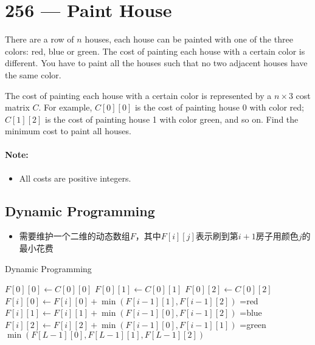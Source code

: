 \section{256 --- Paint House}
There are a row of $n$ houses, each house can be painted with one of the three colors: red, blue or green. The cost of painting each house with a certain color is different. You have to paint all the houses such that no two adjacent houses have the same color.
\par
The cost of painting each house with a certain color is represented by a $n \times 3$ cost matrix $C$. For example, $C[0][0]$ is the cost of painting house 0 with color red; $C[1][2]$ is the cost of painting house 1 with color green, and so on. Find the minimum cost to paint all houses.
\paragraph{Note:}
\begin{itemize}
\item All costs are positive integers.
\end{itemize}
\subsection{Dynamic Programming}
\begin{itemize}
\item 需要维护一个二维的动态数组$F$，其中$F[i][j]$表示刷到第$i+1$房子用颜色$j$的最小花费
\end{itemize}
\setcounter{algorithm}{0}
\begin{algorithm}[H]
\caption{Dynamic Programming}
\begin{algorithmic}[1]
\State $F[0][0]\gets C[0][0]$
\State $F[0][1]\gets C[0][1]$
\State $F[0][2]\gets C[0][2]$
\State $F[i][0]\gets F[i][0] + \min(F[i-1][1], F[i-1][2])$ =red
\State $F[i][1]\gets F[i][1]+\min(F[i-1][0], F[i-1][2])$ =blue
\State $F[i][2]\gets F[i][2] + \min(F[i-1][0], F[i-1][1])$ =green
\EndFor
\State \Return $\min(F[L-1][0], F[L-1][1], F[L-1][2])$
\EndProcedure
\end{algorithmic}
\end{algorithm}
